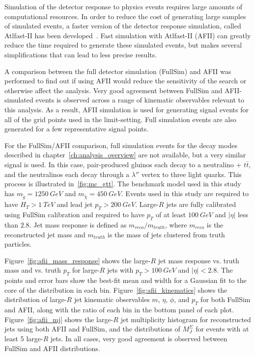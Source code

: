 Simulation of the detector response to physics events requires large amounts of computational resources.
In order to reduce the cost of generating large samples of simulated events, a faster version of the detector response simulation, called Atlfast-II has been developed~\cite{mc-atlfast}.
Fast simulation with Atlfast-II (AFII) can greatly reduce the time required to generate these simulated events, but makes several simplifications that can lead to less precise results.

A comparison between the full detector simulation (FullSim) and AFII was performed to find out if using AFII would reduce the sensitivity of the search or otherwise affect the analysis.
Very good agreement between FullSim and AFII-simulated events is observed across a range of kinematic observables relevant to this analysis.
As a result, AFII simulation is used for generating signal events for all of the grid points used in the limit-setting.
Full simulation events are also generated for a few representative signal points.

For the FullSim/AFII comparison, full simulation events for the decay modes described in chapter~\ref{ch:analysis_overview} are not available, but a very similar signal is used.
In this case, pair-produced gluinos each decay to a neutralino + $t\bar{t}$, and the neutralinos each decay through a $\lambda''$ vertex to three light quarks.
This process is illustrated in~\ref{fig:mc_gtt}.
The benchmark model used in this study has $m_{\tilde{g}}=1250~GeV$ and $m_{\tilde{\chi}}=450~GeV$.
Events used in this study are required to have $H_{T}>1~TeV$ and lead jet $p_{T}>200~GeV$.
Large-$R$ jets are fully calibrated using FullSim calibration and required to have $p_{T}$ of at least $100~GeV$ and $|\eta|$ less than $2.8$.
Jet mass response is defined as $m_{reco}/m_{truth}$, where $m_{reco}$ is the reconstructed jet mass and $m_{truth}$ is the mass of jets clustered from truth particles.

Figure~\ref{fig:afii_mass_response} shows the large-$R$ jet mass response vs. truth mass and vs. truth $p_{T}$ for large-$R$ jets with $p_{T}>100~GeV$ and $|\eta|<2.8$.
The points and error bars show the best-fit mean and width for a Gaussian fit to the core of the distribution in each bin.
Figure~\ref{fig:afii_kinematics} shows the distribution of large-$R$ jet kinematic observables $m$, $\eta$, $\phi$, and $p_{T}$ for both FullSim and AFII, along with the ratio of each bin in the bottom panel of each plot.
Figure~\ref{fig:afii_mj} shows the large-$R$ jet multiplicity histogram for reconstructed jets using both AFII and FullSim, and the distributions of $M_{J}^{\Sigma}$ for events with at least 5 large-$R$ jets.
In all cases, very good agreement is observed between FullSim and AFII distributions.

